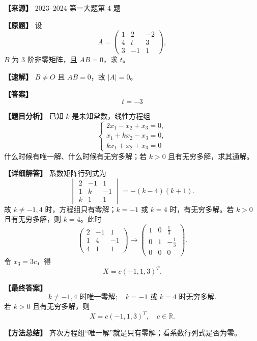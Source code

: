\documentclass[11pt,a4paper,UTF8]{ctexart}
\begin{document}
\begin{answerbox}
\textbf{【来源】} 2023--2024 第一大题第 4 题

\textbf{【原题】}
设
\[
A=\begin{pmatrix}1&2&-2\\4&t&3\\3&-1&1\end{pmatrix},
\]
$B$ 为 $3$ 阶非零矩阵，且 $AB=0$，求 $t$。

\textbf{【速解】}
$B\ne O$ 且 $AB=0$，故 $|A|=0$。

\textbf{【答案】}
\[t=-3\]
\end{answerbox}

\begin{answerbox}
\textbf{【题目分析】} 已知 $k$ 是未知常数，线性方程组
\[
\begin{cases}
2x_1-x_2+x_3=0,\\
x_1+kx_2-x_3=0,\\
kx_1+x_2+x_3=0
\end{cases}
\]
什么时候有唯一解、什么时候有无穷多解；若 $k>0$ 且有无穷多解，求其通解。

\textbf{【详细解答】} 系数矩阵行列式为
\[
\begin{vmatrix}
2&-1&1\\
1&k&-1\\
k&1&1
\end{vmatrix}
=-(k-4)(k+1).
\]
故 $k\ne-1,4$ 时，方程组只有零解；$k=-1$ 或 $k=4$ 时，有无穷多解。若 $k>0$ 且有无穷多解，则 $k=4$。此时
\[
\begin{pmatrix}
2&-1&1\\
1&4&-1\\
4&1&1
\end{pmatrix}
\to
\begin{pmatrix}
1&0&\frac13\\
0&1&-\frac13\\
0&0&0
\end{pmatrix}.
\]
令 $x_3=3c$，得
\[
X=c(-1,1,3)^T.
\]

\textbf{【最终答案】}
\[
k\ne-1,4\text{ 时唯一零解};\quad k=-1\text{ 或 }k=4\text{ 时无穷多解}.
\]
若 $k>0$ 且有无穷多解，则
\[
X=c(-1,1,3)^T,\quad c\in\mathbb R.
\]

\textbf{【方法总结】} 齐次方程组“唯一解”就是只有零解；看系数行列式是否为零。
\end{answerbox}
\end{document}
